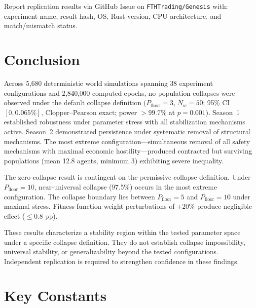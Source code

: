 \documentclass[11pt,a4paper]{article}
\begin{document}
Report replication results via GitHub Issue on \texttt{FTHTrading/Genesis} with: experiment name, result hash, OS, Rust version, CPU architecture, and match/mismatch status.

\section{Conclusion}

Across 5,680 deterministic world simulations spanning 38 experiment configurations and 2,840,000 computed epochs, no population collapses were observed under the default collapse definition ($P_{\text{floor}} = 3$, $N_w = 50$; 95\% CI $[0, 0.065\%]$, Clopper--Pearson exact; power $> 99.7\%$ at $p = 0.001$). Season~1 established robustness under parameter stress with all stabilization mechanisms active. Season~2 demonstrated persistence under systematic removal of structural mechanisms. The most extreme configuration---simultaneous removal of all safety mechanisms with maximal economic hostility---produced contracted but surviving populations (mean 12.8 agents, minimum 3) exhibiting severe inequality.

The zero-collapse result is contingent on the permissive collapse definition. Under $P_{\text{floor}} = 10$, near-universal collapse (97.5\%) occurs in the most extreme configuration. The collapse boundary lies between $P_{\text{floor}} = 5$ and $P_{\text{floor}} = 10$ under maximal stress. Fitness function weight perturbations of $\pm 20\%$ produce negligible effect ($\leq 0.8$ pp).

These results characterize a stability region within the tested parameter space under a specific collapse definition. They do not establish collapse impossibility, universal stability, or generalizability beyond the tested configurations. Independent replication is required to strengthen confidence in these findings.




\appendix

\section{Key Constants}\label{app:constants}
\end{document}
